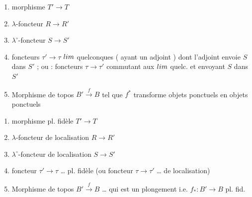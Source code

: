 \documentclass[11pt,a4paper]{article}
\begin{document}
\begin{enumerate}
  \item[{[T]}] morphisme $T' \to T$
  \item[{[R]}] $\lambda$-foncteur $R \to R'$
  \item[{[S]}] $\lambda^{\circ}$-foncteur $S \to S'$
  \item[{[$\tau$]}] foncteurs $\tau' \to \tau$  
     
    $\varinjlim$ quelconques ( ayant un adjoint )
    dont l'adjoint envoie $S$ dans $S'$ ; ou : foncteurs $\tau \to \tau'$
    commutant aux $\varinjlim$ quelc. et envoyant $S$ dans $S'$
  \item[{[B]}] Morphisme de topos $B' \xrightarrow{f} B$ tel que $f^{*}$
    transforme objets ponctuels en objets ponctuels \struck{\ill{}}
\end{enumerate}

\begin{enumerate}
  \item[{[T]}] morphisme pl. fidèle $T' \to T$
  \item[{[R]}] $\lambda$-foncteur de localisation $R \to R'$
  \item[{[S]}] $\lambda^{\circ}$-foncteur de localisation $S \to S'$
  \item[{[$\tau$]}] foncteur $\tau' \to \tau$ \ldots{} pl. fidèle (ou
    foncteur $\tau \to \tau'$ \ldots{} de localisation)
  \item[{[B]}] Morphisme de topos $B' \xrightarrow{f} B$ \ldots{} qui est un plongement
    i.e. $f_{*} : B' \to B$ pl. fid.
\end{enumerate}
\end{document}

